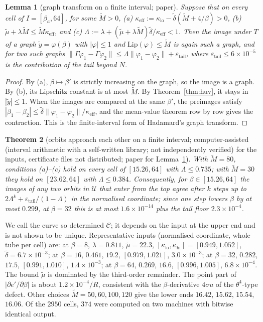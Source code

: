 \documentclass[11pt,a4paper]{article}
\newtheorem{theorem}{Theorem}[section]
\newtheorem{lemma}[theorem]{Lemma}
\theoremstyle{definition}
\theoremstyle{remark}
\newcommand{\cU}{\mathcal{U}}
\newcommand{\cC}{\mathcal{C}}
\newcommand{\IA}{computer-assisted (interval arithmetic with a self-written library; not independently verified)}
\begin{document}
\begin{lemma}[graph transform on a finite interval; paper]\label{lem:graph}
Suppose that on every cell of $I=[\beta_a,64]$, for some $\tilde M>0$,
(a) $\kappa_{\mathrm{eff}}:=\kappa_{\mathrm{lo}}-\tilde\delta(\tilde M+4/\beta)>0$,
(b) $\tilde\mu+\lambda\tilde M\le\tilde M\kappa_{\mathrm{eff}}$, and
(c) $\Lambda:=\lambda+(\tilde\mu+\lambda\tilde M)\tilde\delta/\kappa_{\mathrm{eff}}<1$.
Then the image under $T$ of a graph $\tilde y=\varphi(\beta)$ with $|\varphi|\le1$ and $\mathrm{Lip}(\varphi)\le\tilde M$ is again such a graph, and for two such graphs $\|\Gamma\varphi_1-\Gamma\varphi_2\|\le\Lambda\|\varphi_1-\varphi_2\|+\varepsilon_{\mathrm{tail}}$, where $\varepsilon_{\mathrm{tail}}\le6\times10^{-5}$ is the contribution of the tail beyond $N$.
\end{lemma}
\begin{proof}
By (a), $\beta\mapsto\beta'$ is strictly increasing on the graph, so the image is a graph.
By (b), its Lipschitz constant is at most $\tilde M$.
By Theorem~\ref{thm:huv}, it stays in $|\tilde y|\le1$.
When the images are compared at the same $\beta'$, the preimages satisfy $|\beta_1-\beta_2|\le\tilde\delta\|\varphi_1-\varphi_2\|/\kappa_{\mathrm{eff}}$, and the mean-value theorem row by row gives the contraction.
This is the finite-interval form of Hadamard's graph transform.
\end{proof}

\begin{theorem}[orbits approach each other on a finite interval; \IA{} for the inputs, certificate files not distributed; paper for Lemma~\ref{lem:graph}]\label{thm:curve}
With $\tilde M=80$, conditions (a)--(c) hold on every cell of $[15.26,64]$ with $\Lambda\le0.735$; with $\tilde M=30$ they hold on $[23.62,64]$ with $\Lambda\le0.384$.
Consequently, for $\beta\in[15.26,64]$ the images of any two orbits in $\cU$ that enter from the top agree after $k$ steps up to $2\Lambda^k+\varepsilon_{\mathrm{tail}}/(1-\Lambda)$ in the normalised coordinate; since one step lowers $\beta$ by at most $0.299$, at $\beta=32$ this is at most $1.6\times10^{-14}$ plus the tail floor $2.3\times10^{-4}$.
\end{theorem}
We call the curve so determined $\cC$; it depends on the input at the upper end and is not shown to be unique.
Representative inputs (normalised coordinate, whole tube per cell) are: at $\beta=8$, $\lambda=0.811$, $\tilde\mu=22.3$, $[\kappa_{\mathrm{lo}},\kappa_{\mathrm{hi}}]=[0.949,1.052]$, $\tilde\delta=6.7\times10^{-3}$; at $\beta=16$, $0.461$, $19.2$, $[0.979,1.021]$, $3.0\times10^{-3}$; at $\beta=32$, $0.282$, $17.5$, $[0.991,1.010]$, $1.4\times10^{-3}$; at $\beta=64$, $0.269$, $16.6$, $[0.996,1.005]$, $6.8\times10^{-4}$.
The bound $\tilde\mu$ is dominated by the third-order remainder.
The point part of $|\partial e'/\partial\beta|$ is about $1.2\times10^{-4}/R$, consistent with the $\beta$-derivative $4\sigma u$ of the $\theta^4$-type defect.
Other choices $\tilde M=50,60,100,120$ give the lower ends $16.42$, $15.62$, $15.54$, $16.06$.
Of the $2950$ cells, $374$ were computed on two machines with bitwise identical output.
\end{document}
